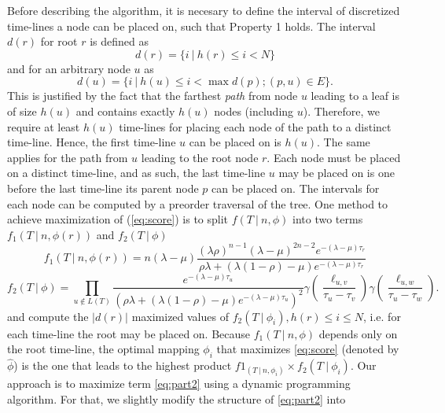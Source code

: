\documentclass{llncs}
\begin{document}
Before describing the algorithm, it is necesary to define the interval of
discretized time-lines a node can be placed on, such that Property 1 holds. The
interval $d(r)$ for root $r$ is defined as $$d(r) = \{ i\ |\ h(r) \leq i <
N\}$$ and for an arbitrary node $u$ as $$d(u) = \{ i\ |\ h(u) \leq i < \max
d(p); (p,u) \in E\}.$$ This is justified by the fact that the farthest {\em
path} from node $u$ leading to a leaf is of size $h(u)$ and contains exactly
$h(u)$ nodes (including $u$).  Therefore, we require at least $h(u)$ time-lines
for placing each node of the path to a distinct time-line.  Hence, the first
time-line $u$ can be placed on is $h(u)$. The same applies for the path from
$u$ leading to the root node $r$.  Each node must be placed on a distinct
time-line, and as such, the last time-line $u$ may be placed on is one before
the last time-line its parent node $p$ can be placed on. The intervals for each
node can be computed by a preorder traversal of the tree. One method to achieve
maximization of (\ref{eq:score}) is to split $f(T\ |\ n, \phi)$ into two terms
$f_1(T\ |\ n,\phi(r))$ and $f_2(T\ |\ \phi)$
%
%
\begin{equation}\label{eq:part1} 
f_1(T\ |\ n,\phi(r)) = n (\lambda-\mu)
                       \frac{(\lambda\rho)^{n-1}%
                             (\lambda-\mu)^{2n-2}%
                             e^{-(\lambda-\mu)\tau_r}}%
                            {\rho\lambda +%
                             (\lambda(1 -\rho)-\mu)%
                             e^{-(\lambda-\mu)\tau_r}}
\end{equation}
%
%
\begin{equation}\label{eq:part2}
f_2(T\ |\ \phi) = \prod_{u\notin L(T)}
                  \frac{e^{-(\lambda-\mu)\tau_u}}
                       {(\rho\lambda + 
                        (\lambda(1-\rho)-\mu)
                        e^{-(\lambda-\mu)\tau_u})^2}
                  \gamma(\frac{\ell_{u,v}}{\tau_u-\tau_v})
                  \gamma(\frac{\ell_{u,w}}{\tau_u-\tau_w}).
\end{equation}
%
%
and compute the $|d(r)|$ maximized values of $f_2(T\ |\ \phi_i), h(r) \leq i
\leq N$, i.e. for each time-line the root may be placed on. Because $f_1(T\ |\
n,\phi)$ depends only on the root time-line, the optimal mapping $\phi_i$ that
maximizes \ref{eq:score} (denoted by $\hat\phi$) is the one that leads to the
highest product $f1_(T\ |\ n,\phi_i)\times f_2(T\ |\ \phi_i)$.%
Our approach is to maximize term \ref{eq:part2} using a dynamic programming
algorithm. For that, we slightly modify the structure of \ref{eq:part2} into
\end{document}
